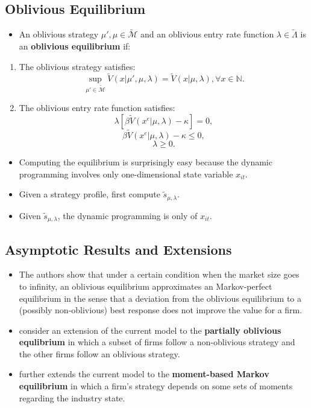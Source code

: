 \documentclass[
]{book}
\providecommand{\tightlist}{%
  \setlength{\itemsep}{0pt}\setlength{\parskip}{0pt}}
\begin{document}
\hypertarget{oblivious-equilibrium}{%
\subsection{Oblivious Equilibrium}\label{oblivious-equilibrium}}

\begin{itemize}
\tightlist
\item
  An oblivious strategy \(\mu', \mu \in \widetilde{\mathcal{M}}\) and an oblivious entry rate function \(\lambda \in \widetilde{\Lambda}\) is an \textbf{oblivious equilibrium} if:
\end{itemize}

\begin{enumerate}
\def\labelenumi{\arabic{enumi}.}
\tightlist
\item
  The oblivious strategy satisfies:
  \[
  \sup_{\mu'  \in \widetilde{\mathcal{M}}} \widetilde{V}(x|\mu', \mu, \lambda) = \widetilde{V}(x|\mu, \lambda), \forall x \in \mathbb{N}.
  \]
\item
  The oblivious entry rate function satisfies:
  \[
  \lambda [\beta \widetilde{V}(x^e|\mu, \lambda) - \kappa] = 0,
  \]
  \[
  \beta \widetilde{V}(x^e|\mu, \lambda) - \kappa \le 0,
  \]
  \[
  \lambda \ge 0.
  \]
\end{enumerate}

\begin{itemize}
\tightlist
\item
  Computing the equilibrium is surprisingly easy because the dynamic programming involves only one-dimensional state variable \(x_{it}\).
\item
  Given a strategy profile, first compute \(\tilde{s}_{\mu, \lambda}\).
\item
  Given \(\tilde{s}_{\mu, \lambda}\), the dynamic programming is only of \(x_{it}\).
\end{itemize}

\hypertarget{asymptotic-results-and-extensions}{%
\subsection{Asymptotic Results and Extensions}\label{asymptotic-results-and-extensions}}

\begin{itemize}
\tightlist
\item
  The authors show that under a certain condition when the market size goes to infinity, an oblivious equilibrium approximates an Markov-perfect equilibrium in the sense that a deviation from the oblivious equilibrium to a (possibly non-oblivious) best response does not improve the value for a firm.
\item
  \citet{Benkard2015} consider an extension of the current model to the \textbf{partially oblivious equlibrium} in which a subset of firms follow a non-oblivious strategy and the other firms follow an oblivious strategy.
\item
  \citet{Ifrach2017} further extends the current model to the \textbf{moment-based Markov equilibrium} in which a firm's strategy depends on some sets of moments regarding the industry state.
\end{itemize}
\end{document}
